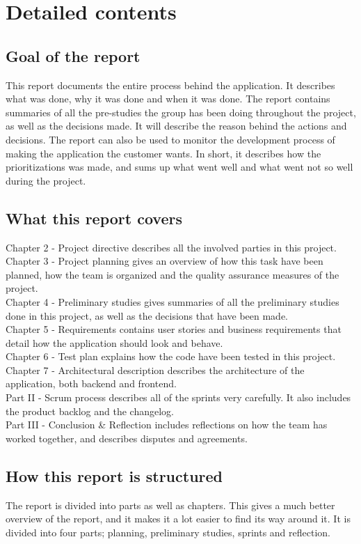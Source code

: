 \chapter*{Detailed contents}

\section*{Goal of the report}
This report documents the entire process behind the application. It describes what was done, why it was done and when it was done. The report contains summaries of all the pre-studies the group has been doing throughout the project, as well as the decisions made. It will describe the reason behind the actions and decisions.
The report can also be used to monitor the development process of making the application the customer wants. In short, it describes how the prioritizations was made, and sums up what went well and what went not so well during the project.

\section*{What this report covers}
Chapter 2 - Project directive describes all the involved parties in this project. \\ 
Chapter 3 - Project planning gives an overview of how this task have been planned, how the team is organized and the quality assurance measures of the project. \\
Chapter 4 - Preliminary studies gives summaries of all the preliminary studies done in this project, as well as the decisions that have been made. \\
Chapter 5 - Requirements contains user stories and business requirements that detail how the application should look and behave. \\ 
Chapter 6 - Test plan explains how the code have been tested in this project. \\
Chapter 7 - Architectural description describes the architecture of the application, both backend and frontend. \\
Part II - Scrum process describes all of the sprints very carefully. It also includes the product backlog and the changelog. \\
Part III - Conclusion \& Reflection includes reflections on how the team has worked together, and describes disputes and agreements.

\section*{How this report is structured}
The report is divided into parts as well as chapters. This gives a much better overview of the report, and it makes it a lot easier to find its way around it. It is divided into four parts; planning, preliminary studies, sprints and reflection.